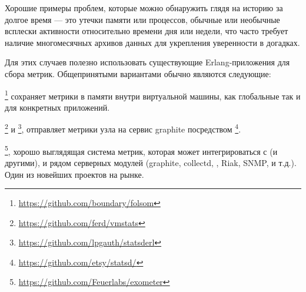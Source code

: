 Хорошие примеры проблем, которые можно обнаружить глядя на историю за долгое время --- это утечки памяти или процессов, обычные или необычные всплески активности относительно времени дня или недели, что часто требует наличие многомесячных архивов данных для укрепления уверенности в догадках.

Для этих случаев полезно использовать существующие Erlang-приложения для сбора метрик. Общепринятыми вариантами обычно являются следующие:

\begin{itemize*}
	\item {}\footnote{\href{https://github.com/boundary/folsom}{https://github.com/boundary/folsom}} сохраняет метрики в памяти внутри виртуальной машины, как глобальные так и для конкретных приложений.
	\item {}\footnote{\href{https://github.com/ferd/vmstats}{https://github.com/ferd/vmstats}} и \footnote{\href{https://github.com/lpgauth/statsderl}{https://github.com/lpgauth/statsderl}}, отправляет метрики узла на сервис graphite посредством \footnote{\href{https://github.com/etsy/statsd/}{https://github.com/etsy/statsd/}}.
	\item {}\footnote{\href{https://github.com/Feuerlabs/exometer}{https://github.com/Feuerlabs/exometer}}, хорошо выглядящая система метрик, которая может интегрироваться с  (и другими), и рядом серверных модулей (graphite, collectd, , Riak, SNMP, и т.д.). Один из новейших проектов на рынке.

\end{itemize*}
